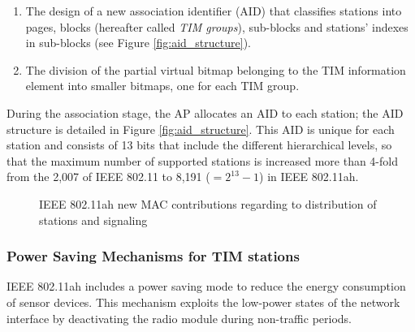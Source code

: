 \documentclass[]{article}
\begin{document}
\begin{enumerate}
\item The design of a new association identifier (AID) that classifies stations into pages, blocks (hereafter called \textit{TIM groups}), sub-blocks and stations' indexes in sub-blocks (see Figure  \ref{fig:aid_structure}).
\item The division of the partial virtual bitmap belonging to the TIM information element into smaller bitmaps, one for each TIM group.
\end{enumerate}

During the association stage, the AP allocates an AID to each station; the AID structure is detailed in Figure \ref{fig:aid_structure}. This AID is unique for each station and consists of 13 bits that include the different hierarchical levels, so that the maximum number of supported stations is increased more than 4-fold from the 2,007 of IEEE 802.11 to 8,191 ($= 2^{13}-1$) in IEEE 802.11ah. 


\setcounter{figure}{0}
\begin{figure}[p]
\begin{center}
\centering{}
\caption{IEEE 802.11ah new MAC contributions regarding to distribution of stations and signaling} \label{fig:Figure1}
\end{center}
\end{figure}

\subsubsection{Power Saving Mechanisms for TIM stations}
IEEE 802.11ah includes a power saving mode to reduce the energy consumption of sensor devices. This mechanism exploits the low-power states of the network interface by deactivating the radio module during non-traffic periods.
\end{document}
